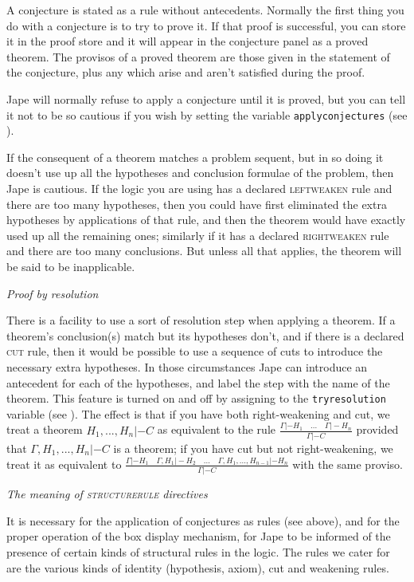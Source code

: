 A conjecture is stated as a rule without antecedents. Normally the first thing you do with a conjecture is to try to prove it. If that proof is successful, you can store it in the proof store and it will appear in the conjecture panel as a proved theorem. The provisos of a proved theorem are those given in the statement of the conjecture, plus any which arise and aren't satisfied during the proof.


Jape will normally refuse to apply a conjecture until it is proved, but you can tell it not to be so cautious if you wish by setting the variable \texttt{applyconjectures} (see ).


If the consequent of a theorem matches a problem sequent, but in so doing it doesn't use up all the hypotheses and conclusion formulae of the problem, then Jape is cautious. If the logic you are using has a declared \textsc{leftweaken} rule and there are too many hypotheses, then you could have first eliminated the extra hypotheses by applications of that rule, and then the theorem would have exactly used up all the remaining ones; similarly if it has a declared \textsc{rightweaken} rule and there are too many conclusions. But unless all that applies, the theorem will be said to be inapplicable.


\textit{Proof by resolution}


There is a facility to use a sort of resolution step when applying a theorem. If a theorem's conclusion(s) match but its hypotheses don't, and if there is a declared \textsc{cut} rule, then it would be possible to use a sequence of cuts to introduce the necessary extra hypotheses. In those circumstances Jape can introduce an antecedent for each of the hypotheses, and label the step with the name of the theorem. This feature is turned on and off by assigning to the \texttt{tryresolution} variable (see ). The effect is that if you have both right-weakening and cut, we treat a theorem $H_{1},...,H_{n}  |- C$ as equivalent to the rule $\frac{\Gamma  |- H_{1} \quad ...\quad \Gamma  |- H_{n} }{\Gamma  |- C} $ provided that $\Gamma,H_{1},...,H_{n}  |- C$ is a theorem; if you have cut but not right-weakening, we treat it as equivalent to $\frac{\Gamma  |- H_{1} \quad \Gamma,H_{1}  |- H_{2} \quad ...\quad \Gamma,H_{1},...,H_{n-1}  |- H_{n} }{\Gamma  |- C} $ with the same proviso.


\textit{The meaning of \textsc{structurerule} directives}


It is necessary for the application of conjectures as rules (see above), and for the proper operation of the box display mechanism, for Jape to be informed of the presence of certain kinds of structural rules in the logic. The rules we cater for are the various kinds of identity (hypothesis, axiom), cut and weakening rules.


